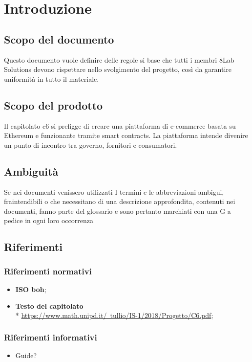 \section{Introduzione}
\subsection{Scopo del documento}
Questo documento vuole definire delle regole si base che tutti i membri 8Lab
Solutions devono rispettare nello svolgimento del progetto, così da garantire
uniformità in tutto il materiale.
\subsection{Scopo del prodotto}
Il capitolato c6 si prefigge di creare una piattaforma di e-commerce basata su Ethereum e funzionante tramite smart contracts. La piattaforma intende divenire un punto di incontro tra governo, fornitori e consumatori.
\subsection{Ambiguità}
Se nei documenti venissero utilizzati I termini e le abbreviazioni ambigui,
fraintendibili o che necessitano di una descrizione approfondita, contenuti nei documenti, fanno parte del glossario e sono pertanto marchiati con una G a pedice in ogni loro occorrenza
\subsection{Riferimenti}
\subsubsection{Riferimenti normativi}
\begin{itemize}
\item \textbf{ISO boh}; %
\item \textbf{Testo del capitolato} \\*  \href{https://www.math.unipd.it/~tullio/IS-1/2018/Progetto/C6.pdf}{https://www.math.unipd.it/~tullio/IS-1/2018/Progetto/C6.pdf};
\end{itemize}
\subsubsection{Riferimenti informativi}
\begin{itemize}
\item Guide?
\end{itemize}